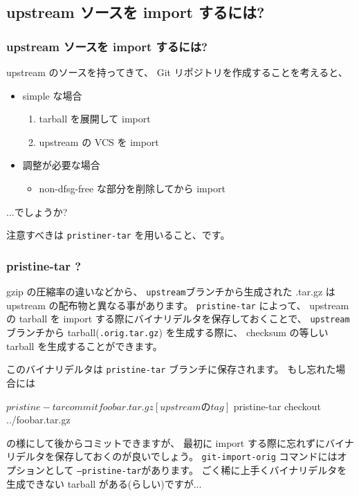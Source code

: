 \documentclass[mingoth,a4paper]{jsarticle}
\begin{document}
\subsection*{upstream ソースを import するには?}
\label{sec-2}
\subsubsection*{upstream ソースを import するには?}
\label{sec-2-1}

upstream のソースを持ってきて、
Git リポジトリを作成することを考えると、
\begin{itemize}
\item simple な場合
  \begin{enumerate}
  \item tarball を展開して import
  \item upstream の VCS を import
  \end{enumerate}
\item 調整が必要な場合
  \begin{itemize}
  \item non-dfsg-free な部分を削除してから import
  \end{itemize}
\end{itemize}
...でしょうか?

注意すべきは \texttt{pristiner-tar} を用いること、です。

\subsubsection*{pristine-tar ?}
\label{sec-2-2}

gzip の圧縮率の違いなどから、
\texttt{upstream}ブランチから生成された .tar.gz は upstream の配布物と異なる事があります。
\texttt{pristine-tar} によって、
upstream の tarball を import する際にバイナリデルタを保存しておくことで、
\texttt{upstream} ブランチから tarball(\texttt{.orig.tar.gz}) を生成する際に、
checksum の等しい tarball を生成することができます。

このバイナリデルタは \texttt{pristine-tar} ブランチに保存されます。
もし忘れた場合には
\begin{commandline}
  $ pristine-tar commit foobar.tar.gz [upstream の tag]
  $ pristine-tar checkout ../foobar.tar.gz
\end{commandline}
の様にして後からコミットできますが、
最初に import する際に忘れずにバイナリデルタを保存しておくのが良いでしょう。
\texttt{git-import-orig} コマンドにはオプションとして \texttt{--pristine-tar}があります。
ごく稀に上手くバイナリデルタを生成できない tarball がある(らしい)ですが...
\end{document}
